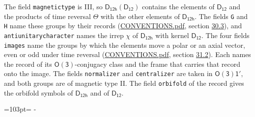 \documentclass[10pt,a4paper]{article}
\newcommand{\needspace}[1]{\par\penalty-100\begingroup\dimen0=#1\relax\dimen2=\pagegoal
  \advance\dimen2-\pagetotal\ifdim\dimen0>\dimen2\relax\ifdim\dimen2>0pt\vfil\break\fi\fi
  \endgroup}
\numberwithin{equation}{section}
\newcommand{\grp}[1]{\mathsf{#1}}
\begin{document}
The field \texttt{magnetictype} is III, so $\grp{D_{12h}}(\grp{D_{12}})$ contains the elements of $\grp{D_{12}}$ and the products of time reversal $\varTheta$ with the other elements of $\grp{D_{12h}}$. The fields \texttt{G} and \texttt{H} name these groups by their records (\href{../../CONVENTIONS.pdf}{CONVENTIONS.pdf}, section \href{../../CONVENTIONS.pdf\#conv.30.3}{30.3}), and \texttt{antiunitarycharacter} names the irrep $\chi$ of $\grp{D_{12h}}$ with kernel $\grp{D_{12}}$. The four fields \texttt{images} name the groups by which the elements move a polar or an axial vector, even or odd under time reversal (\href{../../CONVENTIONS.pdf}{CONVENTIONS.pdf}, section \href{../../CONVENTIONS.pdf\#conv.31.2}{31.2}). Each names the record of its $\grp{O(3)}$-conjugacy class and the frame that carries that record onto the image. The fields \texttt{normalizer} and \texttt{centralizer} are taken in $\grp{O(3)1'}$, and both groups are of magnetic type II. The field \texttt{orbifold} of the record gives the orbifold symbols of $\grp{D_{12h}}$ and of $\grp{D_{12}}$.
\needspace{103pt}
\end{document}
